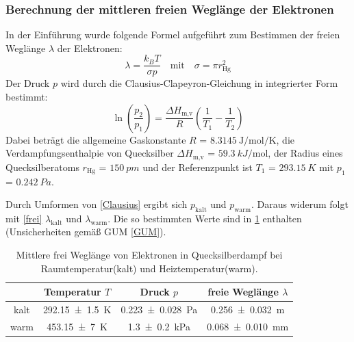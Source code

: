 \documentclass[
	a4paper,
	12pt,
	pagesize,
	ngerman
]{scrartcl}
\begin{document}
	\subsubsection{Berechnung der  mittleren freien Weglänge der Elektronen}
	In der Einführung wurde folgende Formel aufgeführt zum Bestimmen der freien Weglänge $\lambda$ der Elektronen:
	\begin{equation}
		\lambda = \frac{k_B T}{\sigma p} \quad \text{mit} \quad \sigma = \pi r_\text{Hg}^2
		\label{frei}
	\end{equation}
	Der Druck $p$ wird durch die Clausius-Clapeyron-Gleichung in integrierter Form bestimmt:
	\begin{equation}
		\ln\left(\frac{p_2}{p_1}\right) = \frac{\Delta{H_\text{m,v}}}{R} \left( \frac{1}{T_1} - \frac{1}{T_2} \right)
		\label{Clausius}
	\end{equation}
	Dabei beträgt die allgemeine Gaskonstante $R$ = $\SI{8,3145}{\joule \per \mol \per \kelvin}$, die Verdampfungsenthalpie von Quecksilber $\Delta{H_\text{m,v}}$ =  $\SI{59,3}{kJ \per \mol}$, der Radius eines Quecksilberatoms $r_\text{Hg}$ = $\SI{150}{pm}$ und der Referenzpunkt ist $T_1$ = $\SI{293,15}{K}$ mit $p_1$ = $\SI{0,242}{Pa}$.\cite{Quecksilber}\cite{Enthalpie}\cite{NIST}
	
	Durch Umformen von \cref{Clausius} ergibt sich $p_\text{kalt}$ und $p_\text{warm}$.
	Daraus widerum folgt mit \cref{frei} $\lambda_\text{kalt}$ und $\lambda_\text{warm}$.
	Die so bestimmten Werte sind in \cref{TabelleFrei} enthalten (Unsicherheiten gemäß GUM \cref{GUM}).
	
	\begin{table}[H]
		\centering
		\begin{tabular}{ c | c | c | c }
			&Temperatur $T$ & Druck $p$ &  freie Weglänge $\lambda$ \\ \hline
			kalt&\SI{292.15 +- 1,5}{K} &\SI{0,223+-0,028}{Pa} &  \SI{0,256+- 0,032}{m} \\
			warm&\SI{453.15+- 7}{K} & \SI{1,3+-0,2}{kPa} & \SI{0,068 +- 0,010}{mm} \\
		\end{tabular}
		\caption{Mittlere frei Weglänge von Elektronen in Quecksilberdampf bei Raumtemperatur(kalt) und Heiztemperatur(warm).}
		\label{TabelleFrei} 
	\end{table}
	
	
	
\end{document}
